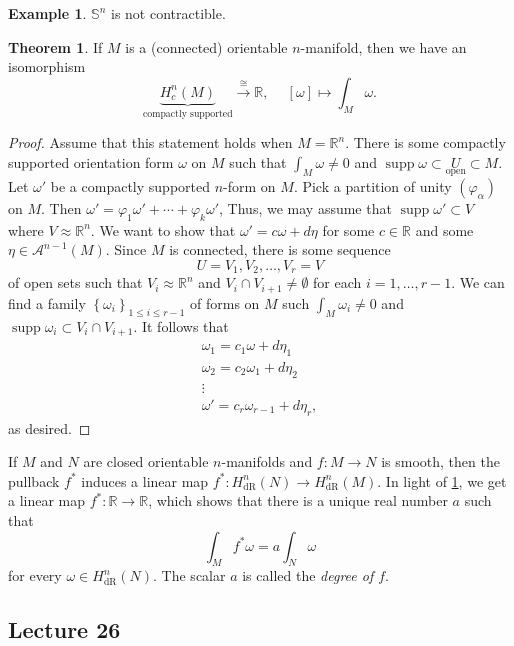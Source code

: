 \documentclass[10pt,letterpaper,cm]{nupset}
\theoremstyle{definition}
\newtheorem{exmp}[definition]{Example}
\theoremstyle{theorem}
\newtheorem{theorem}[definition]{Theorem}
\theoremstyle{remark}
\newcommand{\R}{\mathbb R}
\renewcommand{\S}{\mathbb S}
\newcommand{\1}{\mathbf{1}}
\newcommand{\0}{\vec 0}
\DeclareMathOperator{\supp}{supp}
\DeclareMathOperator{\dr}{dR}
\begin{document}
\begin{exmp}
$\S^n$ is not contractible.
\end{exmp}

\begin{theorem}\label{isom}
If $M$ is a (connected) orientable $n$-manifold, then we have an isomorphism $$\underbrace{H_c^n(M)}_{\text{compactly supported}} \overset{\cong}{\longrightarrow} \R,\ \quad \left[\omega\right] \mapsto \int_M \omega.$$
\end{theorem}
\begin{proof}
Assume that this statement holds when $M = \R^n$. There is some compactly supported orientation form $\omega$ on $M$ such that $\int_M \omega \ne 0$ and $\supp \omega \subset \underset{\text{open}}{U}\subset M$. Let $\omega'$ be a compactly supported $n$-form on $M$. Pick a partition of unity $\left(\varphi_{\alpha}\right)$ on $M$. Then $\omega' =\varphi_1\omega' +\cdots + \varphi_k \omega'$, Thus, we may assume  that $\supp \omega' \subset V$ where $V \approx \R^n$. We want to show that $\omega' =c\omega + d\eta$ for some $c\in \R$ and some $\eta \in \mathcal{A}^{n-1}(M)$. Since $M$ is connected, there is some sequence $$U=V_1, V_2, \ldots, V_r=V$$ of open sets such that $V_i\approx \R^n$ and $V_i\cap V_{i+1} \ne \emptyset$ for each $i=1, \ldots, r-1$. We can find a family $\left\{\omega_i\right\}_{1\leq i \leq r-1}$ of forms on $M$ such $\int_M \omega_i \ne 0$ and $\supp \omega_i \subset V_i \cap V_{i+1}$.  It follows that 
\begin{gather*}
 \omega_1  = c_1\omega + d\eta_1
\\ \omega_2  = c_2\omega_1+ d\eta_2
\\  \vdots
\\  \omega'  =  c_r\omega_{r-1}+d\eta_r
, \end{gather*} as desired.
\end{proof}

If $M$ and $N$ are closed orientable $n$-manifolds and $f: M \to N$ is smooth, then the pullback $f^{\ast}$ induces a linear map $f^{\ast}: H_{\dr}^n(N) \to H_{\dr}^n(M)$. In light of \cref{isom}, we get a linear map $f^{\ast} : \R \to \R$, which shows that there is a unique  real number $a$ such that 
\[
\int_{M} f^{\ast} \omega = a\int_N \omega
\]
 for every $\omega \in H_{\dr}^n(N) $. The scalar $a$ is called the \textit{degree of $f$}. 

\subsection{Lecture 26}
\end{document}
